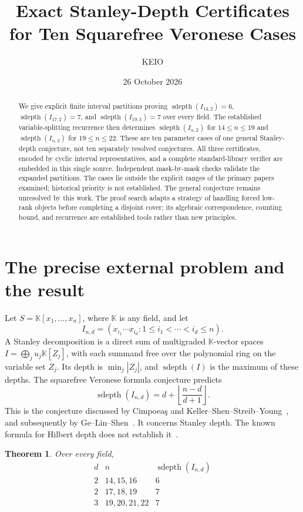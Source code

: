 \documentclass[11pt,a4paper]{article}
\title{\bfseries Exact Stanley-Depth Certificates\protect\\
for Ten Squarefree Veronese Cases}
\author{KEIO}
\date{26 October 2026}
\newtheorem{theorem}{Theorem}[section]
\newcommand{\sd}{\operatorname{sdepth}}
\newcommand{\K}{\mathbb K}
\begin{document}
\maketitle
\begin{abstract}
We give explicit finite interval partitions proving
$\sd(I_{14,2})=6$, $\sd(I_{17,2})=7$, and $\sd(I_{19,3})=7$ over every
field. The established variable-splitting recurrence then determines
$\sd(I_{n,2})$ for $14\le n\le19$ and $\sd(I_{n,3})$ for
$19\le n\le22$. These are ten parameter cases of one general
Stanley-depth conjecture, not ten separately resolved conjectures.
All three certificates, encoded by cyclic interval representatives,
and a complete standard-library verifier are embedded in this single
source. Independent mask-by-mask checks validate the expanded partitions.
The cases lie outside the explicit ranges of the primary papers
examined; historical priority is not established. The general conjecture
remains unresolved by this work. The proof search adapts a strategy of
handling forced low-rank objects before completing a disjoint cover;
its algebraic correspondence, counting bound, and recurrence are established
tools rather than new principles.
\end{abstract}

\section{The precise external problem and the result}
Let $S=\K[x_1,\ldots,x_n]$, where $\K$ is any field, and let
\[
 I_{n,d}=(x_{i_1}\cdots x_{i_d}:1\le i_1<\cdots<i_d\le n).
\]
A Stanley decomposition is a direct sum of multigraded $\K$-vector
spaces $I=\bigoplus_j u_j\K[Z_j]$, with each summand free over the
polynomial ring on the variable set $Z_j$. Its depth is
$\min_j|Z_j|$, and $\sd(I)$ is the maximum of these depths.
The squarefree Veronese formula conjecture predicts
\begin{equation}\label{eq:conjecture}
 \sd(I_{n,d})=d+\left\lfloor\frac{n-d}{d+1}\right\rfloor.
\end{equation}
This is the conjecture discussed by Cimpoea\c{s} and
Keller--Shen--Streib--Young~\cite{KSSY}, and subsequently by
Ge--Lin--Shen~\cite{GLS}. It concerns Stanley depth. The known formula
for Hilbert depth does not establish it~\cite[Remark~3.11]{BCK}.

\begin{theorem}\label{thm:main}
Over every field,
\[
\begin{array}{c|c|c}
d&n&\sd(I_{n,d})\\\hline
2&14,15,16&6\\
2&17,18,19&7\\
3&19,20,21,22&7
\end{array}
\]
\end{theorem}
\end{document}
